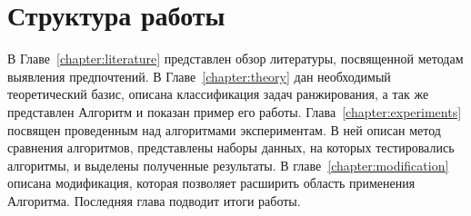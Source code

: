 
\section*{Структура работы}
В Главе~\ref{chapter:literature} представлен обзор литературы, посвященной методам выявления предпочтений. В Главе~\ref{chapter:theory} дан необходимый теоретический базис, описана классификация задач ранжирования, а так же представлен Алгоритм и показан пример его работы. Глава~\ref{chapter:experiments} посвящен проведенным над алгоритмами экспериментам. В ней описан метод сравнения алгоритмов, представлены наборы данных, на которых тестировались алгоритмы, и выделены полученные результаты. В главе~\ref{chapter:modification} описана модификация, которая позволяет расширить область применения Алгоритма. Последняя глава подводит итоги работы.